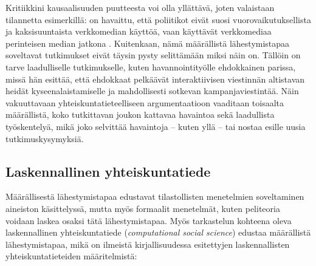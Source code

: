 \documentclass[finnish,gradu,twoside,12pt]{tktltiki}
\begin{document}
Kritiikkini kausaalisuuden puutteesta voi olla yllättävä, joten valaistaan tilannetta esimerkillä: on havaittu, että poliitikot eivät suosi vuorovaikutuksellista ja kaksisuuntaista verkkomedian käyttöä, vaan käyttävät verkkomediaa perinteisen median jatkona \citep{Golbeck2010}. Kuitenkaan, nämä määrällistä lähestymistapaa soveltavat tutkimukset eivät täysin pysty selittämään miksi näin on. Tällöin on tarve laadulliselle tutkimukselle, kuten \citet{Stromer-Galley2000} havannointityölle ehdokkainen parissa, missä hän esittää, että ehdokkaat pelkäävät interaktiivisen viestinnän altistavan heidät kyseenalaistamiselle ja mahdollisesti sotkevan kampanjaviestintää. Näin vakuuttavaan yhteiskuntatieteelliseen argumentaatioon vaaditaan toisaalta määrällistä, koko tutkittavan joukon kattavaa havaintoa sekä laadullista työskentelyä, mikä joko selvittää havaintoja -- kuten yllä -- tai nostaa esille uusia tutkimuskysymyksiä.

\subsection{Laskennallinen yhteiskuntatiede}

Määrällisestä lähestymistapaa edustavat tilastollisten menetelmien soveltaminen aineiston käsittelyssä, mutta myös formaalit menetelmät, kuten peliteoria voidaan laskea osaksi tätä lähestymistapaa. Myös tarkastelun kohteena oleva laskennallinen yhteiskuntatiede (\textit{computational social science}) edustaa määrällistä lähestymistapaa, mikä on ilmeistä kirjallisuudessa esitettyjen laskennallisten yhteiskuntatieteiden määritelmistä:
\end{document}
